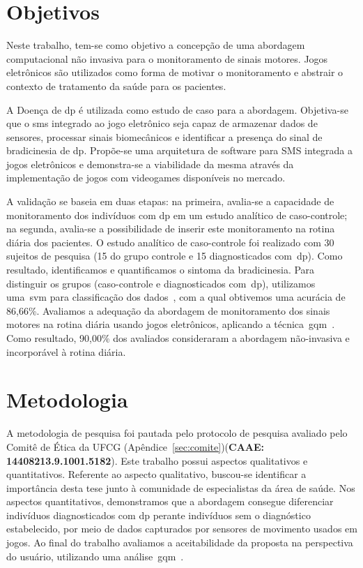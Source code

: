 \section{Objetivos}
Neste trabalho, tem-se como objetivo a concepção de uma abordagem computacional não invasiva para o monitoramento de sinais motores. Jogos eletrônicos são utilizados como forma de motivar o monitoramento e abstrair o contexto de tratamento da saúde para os pacientes.

A Doença de \ac{dp} é utilizada como estudo de caso para a abordagem. Objetiva-se que o \ac{sms} integrado ao jogo eletrônico seja capaz de armazenar dados de sensores, processar sinais biomecânicos e identificar a presença do sinal de bradicinesia de \ac{dp}. Propõe-se uma arquitetura de software para SMS integrada a jogos eletrônicos e demonstra-se a viabilidade da mesma através da implementação de jogos com videogames disponíveis no mercado. 

A validação se baseia em duas etapas: na primeira, avalia-se a capacidade de monitoramento dos indivíduos com \ac{dp} em um estudo analítico de caso-controle; na segunda, avalia-se a possibilidade de inserir este monitoramento na rotina diária dos pacientes. O estudo analítico de caso-controle foi realizado com 30 sujeitos de pesquisa (15 do grupo controle e 15 diagnosticados com~\ac{dp}). Como resultado, identificamos e quantificamos o sintoma da bradicinesia. Para distinguir os grupos (caso-controle e diagnosticados com~\ac{dp}), utilizamos uma~\ac{svm} para classificação dos dados~\cite{datamining2005}, com a qual obtivemos uma acurácia de 86,66\%. Avaliamos a adequação da abordagem de monitoramento dos sinais motores na rotina diária usando jogos eletrônicos, aplicando a técnica~\ac{gqm}~\cite{van1999goal}. Como resultado, 90,00\% dos avaliados consideraram a abordagem não-invasiva e incorporável à rotina diária. 

\section{Metodologia}
A metodologia de pesquisa foi pautada pelo protocolo de pesquisa avaliado pelo Comitê de Ética da UFCG (Apêndice~\ref{sec:comite})(\textbf{CAAE: 14408213.9.1001.5182}). Este trabalho possui aspectos qualitativos e quantitativos. Referente ao aspecto qualitativo, buscou-se identificar a importância desta tese junto à comunidade de especialistas da área de saúde. Nos aspectos quantitativos, demonstramos que a abordagem consegue diferenciar indivíduos diagnosticados com \ac{dp} perante indivíduos sem o diagnóstico estabelecido, por meio de dados capturados por sensores de movimento usados em jogos. Ao final do trabalho avaliamos a aceitabilidade da proposta na perspectiva do usuário, utilizando uma análise~\ac{gqm}~\cite{van1999goal}. 



